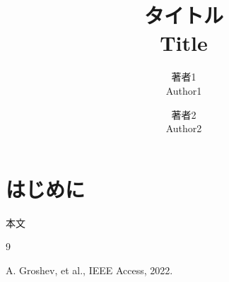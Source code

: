 \documentclass[twocolumn,a4paper,dvipdfmx]{ieicejsp}
\title{
    {\bf タイトル}
    {\normalsize \\ Title }
}
\author{
    著者1 \\ Author1 \and
    著者2 \\ Author2
}
\begin{document}
\maketitle
\section{はじめに}
本文

\vspace{-1mm}
\begin{thebibliography}{9}

    A. Groshev, et al., IEEE Access, 2022.

\end{thebibliography}
\end{document}
